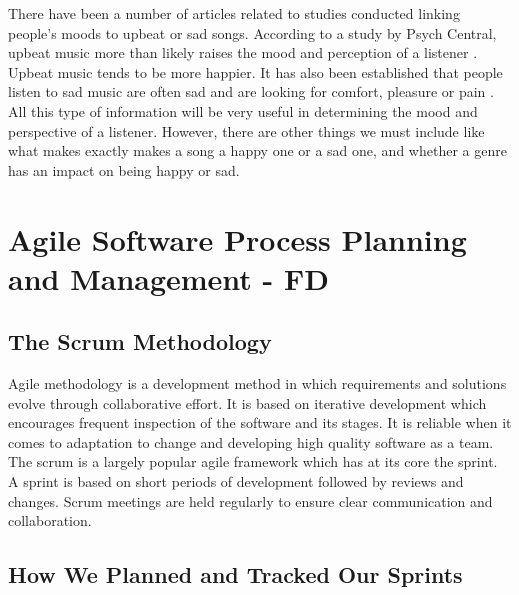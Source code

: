 \documentclass[10pt]{report}
\begin{document}
There have been a number of articles related to studies conducted linking people’s moods to upbeat or sad songs. According to a study by Psych Central, upbeat music more than likely raises the mood and perception of a listener \cite{Nauert2018}. Upbeat music tends to be more happier. It has also been established that people listen to sad music are often sad and are looking for comfort, pleasure or pain \cite{Eerola2016}. All this type of information will be very useful in determining the mood and perspective of a listener. However, there are other things we must include like what makes exactly makes a song a happy one or a sad one, and whether a genre has an impact on being happy or sad.


\chapter{Agile Software Process Planning and Management - FD}

\section{The Scrum Methodology}

Agile methodology is a development method in which requirements and solutions evolve through collaborative effort. It is based on iterative development which encourages frequent inspection of the software and its stages. It is reliable when it comes to adaptation to change and developing high quality software as a team. The scrum is a largely popular agile framework which has at its core the sprint. A sprint is based on short periods of development followed by reviews and changes. Scrum meetings are held regularly to ensure clear communication and collaboration.

\section{How We Planned and Tracked Our Sprints}
\end{document}
